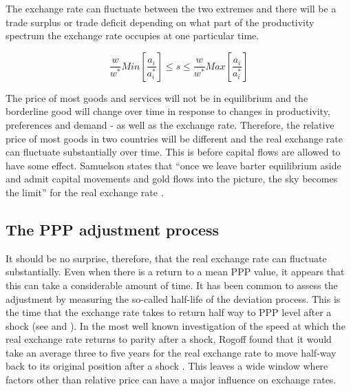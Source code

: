 \documentclass[12pt, a4paper, oneside]{article}\usepackage[]{graphicx}\usepackage[]{color}
\begin{document}
The exchange rate can fluctuate between the two extremes and there will be a trade surplus or trade deficit depending on what part of the productivity spectrum the exchange rate occupies at one particular time. 

\begin{equation}
\frac{w}{w^*} Min \left [\frac{a_i}{a^*_i} \right ]\leq s \leq \frac{w}{w^*}Max \left [ \frac{a_i}{a^*_i} \right ]
\end{equation}

The price of most goods and services will not be in equilibrium and the borderline good will change over time in response to changes in productivity, preferences and demand - as well as the exchange rate. Therefore, the relative price of most goods in two countries will be different and the real exchange rate can fluctuate substantially over time.  This is before capital flows are allowed to have some effect.  Samuelson  states that ``once we leave barter equilibrium aside and admit capital movements and gold flows into the picture, the sky becomes the limit'' for the real exchange rate \citep[p. 146]{samuelson1964trade}. 

\subsection{The PPP adjustment process}
It should be no surprise, therefore, that the real exchange rate can fluctuate substantially.  Even when there is a return to a mean PPP value, it appears that this can take a considerable amount of time.  It has been common to assess the adjustment by measuring the so-called {half-life} of the deviation process.  This is the time that the exchange rate takes to return half way to PPP level after a shock (see \citep{Frankel1986} and \citep{FrankelFroot1987}).  In the most well known investigation of the speed at which the real exchange rate returns to parity after a shock,  Rogoff found that it would take an average three to five years for the real exchange rate to move half-way back to its original position after a shock \citep{RogoffJournal}.   This leaves a wide window where factors other than relative price can have a major influence on exchange rates.  
\end{document}
